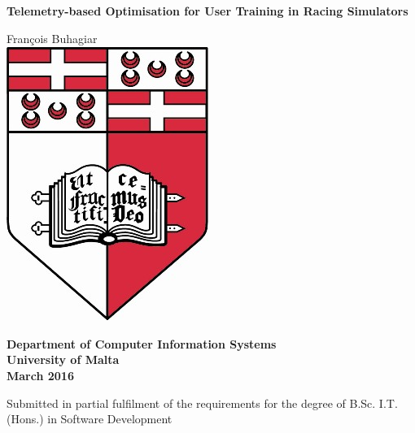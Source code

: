 \documentclass{article}
\begin{document}
\begin{titlepage}
	\begin{center}
		\begin{spacing}{1.5}
			\huge{\textbf{Telemetry-based Optimisation for User Training in Racing Simulators}}
		\end{spacing}
		
		\LARGE{François Buhagiar}
		\vspace{5mm}\\
		\includegraphics[scale=4]{images/UOM_Logo}
		
		\begin{spacing}{1.5}
			\huge{\textbf{Department of Computer Information Systems\\
			\vspace{5mm}
				University of Malta\\
				March 2016 }}
		\end{spacing}
	
		\Large \vfill Submitted in partial fulfilment of the requirements for the degree of B.Sc. I.T. (Hons.) in Software Development
		\clearpage
	\end{center}
\end{titlepage}


\newpage
{} 
\setcounter{page}{1}
\end{document}
